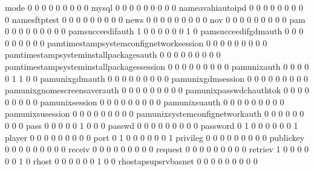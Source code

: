 \documentclass[compress,8pt]{beamer}
\begin{document}
\begin{frame}
\begin{Schunk}
  mode                                       0   0   0   0   0   0   0   0   0
  mysql                                      0   0   0   0   0   0   0   0   0
  nameavahiautoipd                           0   0   0   0   0   0   0   0   0
  namesftptest                               0   0   0   0   0   0   0   0   0
  news                                       0   0   0   0   0   0   0   0   0
  nov                                        0   0   0   0   0   0   0   0   0
  pam                                        0   0   0   0   0   0   0   0   0
  pamsucceedifauth                           1   0   0   0   0   0   0   1   0
  pamsucceedifgdmauth                        0   0   0   0   0   0   0   0   0
  pamtimestampsystemconfignetworksession     0   0   0   0   0   0   0   0   0
  pamtimestampsysteminstallpackagesauth      0   0   0   0   0   0   0   0   0
  pamtimestampsysteminstallpackagessession   0   0   0   0   0   0   0   0   0
  pamunixauth                                0   0   0   0   0   1   1   0   0
  pamunixgdmauth                             0   0   0   0   0   0   0   0   0
  pamunixgdmsession                          0   0   0   0   0   0   0   0   0
  pamunixgnomescreensaverauth                0   0   0   0   0   0   0   0   0
  pamunixpasswdchauthtok                     0   0   0   0   0   0   0   0   0
  pamunixsession                             0   0   0   0   0   0   0   0   0
  pamunixsuauth                              0   0   0   0   0   0   0   0   0
  pamunixsusession                           0   0   0   0   0   0   0   0   0
  pamunixsystemconfignetworkauth             0   0   0   0   0   0   0   0   0
  pass                                       0   0   0   0   0   1   0   0   0
  passwd                                     0   0   0   0   0   0   0   0   0
  password                                   0   1   0   0   0   0   0   0   1
  player                                     0   0   0   0   0   0   0   0   0
  port                                       0   1   0   0   0   0   0   0   1
  privileg                                   0   0   0   0   0   0   0   0   0
  publickey                                  0   0   0   0   0   0   0   0   0
  receiv                                     0   0   0   0   0   0   0   0   0
  request                                    0   0   0   0   0   0   0   0   0
  retriev                                    1   0   0   0   0   0   0   1   0
  rhost                                      0   0   0   0   0   0   1   0   0
  rhostapsupsrvbasnet                        0   0   0   0   0   0   0   0   0

\end{Schunk}
\end{frame}
\end{document}
